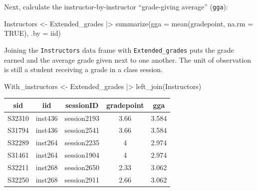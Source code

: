 \documentclass[
  letterpaper,
  DIV=11,
  numbers=noendperiod,
  oneside]{scrartcl}
\newenvironment{Shaded}{\begin{snugshade}}{\end{snugshade}}
\newcommand{\AttributeTok}[1]{\textcolor[rgb]{0.40,0.45,0.13}{#1}}
\newcommand{\ConstantTok}[1]{\textcolor[rgb]{0.56,0.35,0.01}{#1}}
\newcommand{\FunctionTok}[1]{\textcolor[rgb]{0.28,0.35,0.67}{#1}}
\newcommand{\NormalTok}[1]{\textcolor[rgb]{0.00,0.23,0.31}{#1}}
\newcommand{\OtherTok}[1]{\textcolor[rgb]{0.00,0.23,0.31}{#1}}
\newcommand{\SpecialCharTok}[1]{\textcolor[rgb]{0.37,0.37,0.37}{#1}}
\begin{document}
Next, calculate the instructor-by-instructor ``grade-giving average''
(\texttt{gga}):

\begin{Shaded}
\begin{Highlighting}[]
\NormalTok{Instructors }\OtherTok{\textless{}{-}}\NormalTok{ Extended\_grades }\SpecialCharTok{|\textgreater{}}
  \FunctionTok{summarize}\NormalTok{(}\AttributeTok{gga =} \FunctionTok{mean}\NormalTok{(gradepoint, }\AttributeTok{na.rm =} \ConstantTok{TRUE}\NormalTok{), }\AttributeTok{.by =}\NormalTok{ iid)}
\end{Highlighting}
\end{Shaded}


Joining the \texttt{Instructors} data frame with
\texttt{Extended\_grades} puts the grade earned and the average grade
given next to one another. The unit of observation is still a student
receiving a grade in a class session.

\begin{Shaded}
\begin{Highlighting}[]
\NormalTok{With\_instructors }\OtherTok{\textless{}{-}} 
\NormalTok{  Extended\_grades }\SpecialCharTok{|\textgreater{}}
  \FunctionTok{left\_join}\NormalTok{(Instructors)}
\end{Highlighting}
\end{Shaded}

\begin{longtable}[]{@{}ccccc@{}}
\toprule\noalign{}
sid & iid & sessionID & gradepoint & gga \\
\midrule\noalign{}
\endhead
\bottomrule\noalign{}
\endlastfoot
S32310 & inst436 & session2193 & 3.66 & 3.584 \\
S31794 & inst436 & session2541 & 3.66 & 3.584 \\
S32289 & inst264 & session2235 & 4 & 2.974 \\
S31461 & inst264 & session1904 & 4 & 2.974 \\
S32211 & inst268 & session2650 & 2.33 & 3.062 \\
S32250 & inst268 & session2911 & 2.66 & 3.062 \\
\end{longtable}
\end{document}
